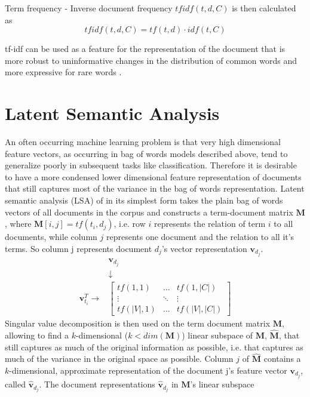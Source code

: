 \documentclass[Thesis.tex]{subfiles}
\begin{document}
Term frequency - Inverse document frequency $tfidf(t,d,C)$ is then
calculated as 
\[
tfidf(t,d,C)=tf(t,d)\cdot idf(t,C)
\]


tf-idf can be used as a feature for the representation of the document
that is more robust to uninformative changes in the distribution of
common words and more expressive for rare words \citep{Manning2008vect}.


\section{Latent Semantic Analysis}

An often occurring machine learning problem is that very high dimensional
feature vectors, as occurring in bag of words models described above,
tend to generalize poorly in subsequent tasks like classification.
Therefore it is desirable to have a more condensed lower dimensional
feature representation of documents that still captures most of the
variance in the bag of words representation. Latent semantic analysis
(LSA) of \citet{Deerwester1990} in its simplest form takes the plain bag of words
vectors of all documents in the corpus and constructs a term-document
matrix $\textbf{M}$, where $\textbf{M}[i,j]=tf(t_{i},d_{j})$, i.e. row $i$ represents
the relation of term $i$ to all documents, while column $j$ represents
one document and the relation to all it's terms. So column j represents document $d_j$'s vector representation $\textbf{v}_{d_j}$.
\[ 
\begin{matrix} & \textbf{v}_{d_j}\\
& \downarrow\\
\textbf{v}_{t_i}^{T}\rightarrow & \begin{bmatrix}tf(1,1) & \dots & tf(1,|C|)\\
\vdots & \ddots & \vdots\\
tf(|V|,1) & \dots & tf(|V|,|C|)
\end{bmatrix}
\end{matrix}
\]
Singular value decomposition is then used on the term document matrix
$\textbf{M}$, allowing to find a $k$-dimensional ($k<dim(\textbf{M})$) linear subspace
of $\textbf{M}$, $\hat{\textbf{M}}$, that still captures as much of the original information
as possible, i.e. that captures as much of the variance in the original
space as possible. Column $j$ of $\hat{\textbf{M}}$ contains a $k$-dimensional,
approximate representation of the document j's feature vector $\textbf{v}_{d_{j}}$, called $\hat{\textbf{v}}_{d_{j}}$.
The document representations $\hat{\textbf{v}}_{d_j}$ in $\textbf{M}$'s linear subspace
\end{document}
